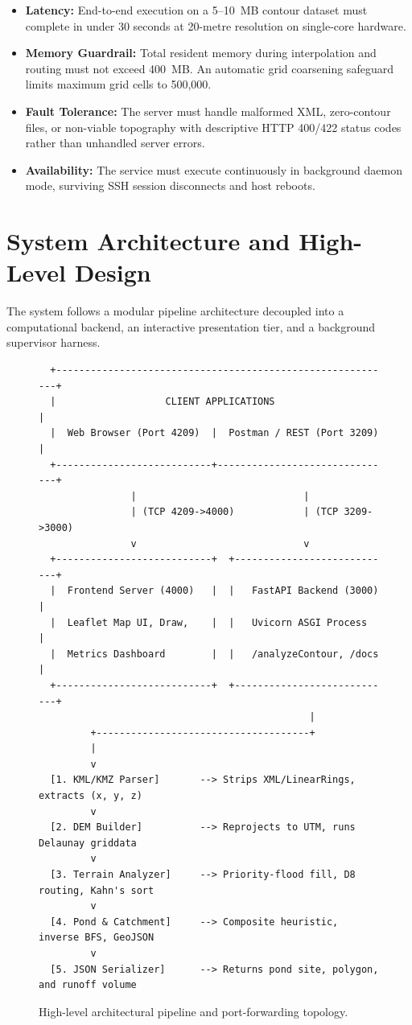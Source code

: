 \documentclass[manuscript,screen,review]{acmart}
\begin{document}
\begin{itemize}
  \item \textbf{Latency:} End-to-end execution on a 5--10~MB contour dataset must complete in under
    30 seconds at 20-metre resolution on single-core hardware.
  \item \textbf{Memory Guardrail:} Total resident memory during interpolation and routing must not
    exceed 400~MB. An automatic grid coarsening safeguard limits maximum grid cells to 500,000.
  \item \textbf{Fault Tolerance:} The server must handle malformed XML, zero-contour files, or non-viable
    topography with descriptive HTTP 400/422 status codes rather than unhandled server errors.
  \item \textbf{Availability:} The service must execute continuously in background daemon mode,
    surviving SSH session disconnects and host reboots.
\end{itemize}

\section{System Architecture and High-Level Design}
\label{sec:architecture}

The system follows a modular pipeline architecture decoupled into a computational backend,
an interactive presentation tier, and a background supervisor harness.

\begin{figure}[h]
  \centering
  \begin{verbatim}
  +-----------------------------------------------------------+
  |                   CLIENT APPLICATIONS                     |
  |  Web Browser (Port 4209)  |  Postman / REST (Port 3209)   |
  +---------------------------+-------------------------------+
                |                             |
                | (TCP 4209->4000)            | (TCP 3209->3000)
                v                             v
  +---------------------------+  +----------------------------+
  |  Frontend Server (4000)   |  |   FastAPI Backend (3000)   |
  |  Leaflet Map UI, Draw,    |  |   Uvicorn ASGI Process     |
  |  Metrics Dashboard        |  |   /analyzeContour, /docs   |
  +---------------------------+  +----------------------------+
                                               |
         +-------------------------------------+
         |
         v
  [1. KML/KMZ Parser]       --> Strips XML/LinearRings, extracts (x, y, z)
         v
  [2. DEM Builder]          --> Reprojects to UTM, runs Delaunay griddata
         v
  [3. Terrain Analyzer]     --> Priority-flood fill, D8 routing, Kahn's sort
         v
  [4. Pond & Catchment]     --> Composite heuristic, inverse BFS, GeoJSON
         v
  [5. JSON Serializer]      --> Returns pond site, polygon, and runoff volume
  \end{verbatim}
  \caption{High-level architectural pipeline and port-forwarding topology.}
  \label{fig:architecture}
\end{figure}
\end{document}
